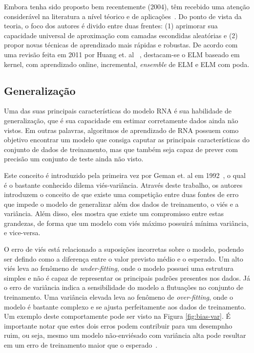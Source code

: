 \documentclass[conference]{IEEEtran}
\begin{document}
	Embora tenha sido proposto bem recentemente (2004), têm recebido uma atenção considerável na literatura a nível téorico e de aplicações~\cite{huang2011survey}. Do ponto de vista da teoria, o foco dos autores é divido entre duas frentes: (1) aprimorar sua capacidade universal de aproximação com camadas escondidas aleatórias e (2) propor novas técnicas de aprendizado mais rápidas e robustas. 
	De acordo com uma revisão feita em 2011 por Huang et. al ~\cite{huang2011survey}, destacam-se o ELM baseado em kernel, com aprendizado online, incremental, \textit{ensemble} de ELM e ELM com poda.
	

	\subsection{Generalização} \label{sec:generalization}
    Uma das suas principais características do modelo RNA é sua habilidade de generalização, que é sua capacidade em estimar corretamente dados ainda não vistos. Em outras palavras, algoritmos de aprendizado de RNA possuem como objetivo encontrar um modelo que consiga caputar as principais características do conjunto de dados de treinamento, mas que também seja capaz de prever com precisão um conjunto de teste ainda não visto.
        
    Este conceito é introduzido pela primeira vez por Geman et. al em 1992~\cite{geman1992neural}, o qual é o bastante conhecido dilema viés-variância. Através deste trabalho, os autores introduzem o conceito de que existe uma competição entre duas fontes de erro que impede o modelo de generalizar além dos dados de treinamento, o viés e a variância. Além disso, eles mostra que existe um compromisso entre estas grandezas, de forma que um modelo com viés máximo possuirá mínima variância, e vice-versa.
    
    O erro de viés está relacionado a suposições incorretas sobre o modelo, podendo ser defindo como a diferença entre o valor previsto médio e o esperado. Um alto viés leva ao fenômeno de \textit{under-fitting}, onde o modelo possuei uma estrutura simples e não é capaz de representar os principais padrões presentes nos dados. Já o erro de variância indica a sensibilidade do modelo a flutuações no conjunto de treinamento. Uma variância elevada leva ao fenômeno de \textit{over-fitting}, onde o modelo é bastante complexo e se ajusta perfeitamente aos dados de treinamento. Um exemplo deste comportamente pode ser visto na Figura \ref{fig:bias-var}. É importante notar que estes dois erros podem contribuir para um desempnho ruim, ou seja, mesmo um modelo não-enviésado com variância alta pode resultar em um erro de treinamento maior que o esperado~\cite{geman1992neural}.
    
\end{document}
